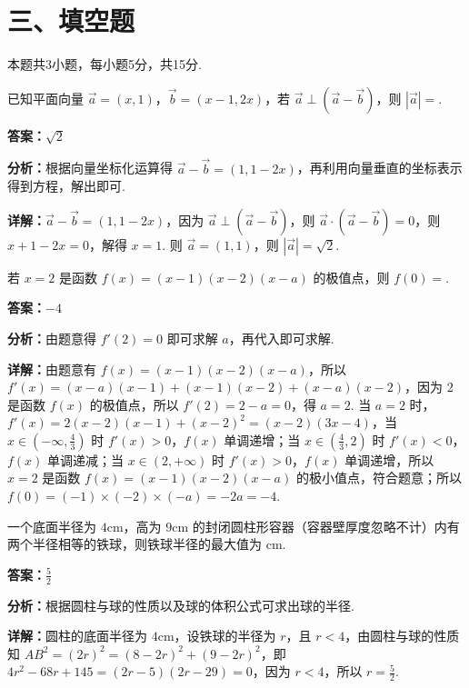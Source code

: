 \section*{三、填空题}
本题共3小题，每小题5分，共15分.

\begin{question}[points=5]
已知平面向量 $\vec{a}=(x,1)$，$\vec{b}=(x-1,2x)$，若 $\vec{a}\perp(\vec{a}-\vec{b})$，则 $|\vec{a}|=$.
\fillin[{$\sqrt{2}$}]
\begin{solution}
\textbf{答案：}$\sqrt{2}$

\textbf{分析：}根据向量坐标化运算得 $\vec{a}-\vec{b}=(1,1-2x)$，再利用向量垂直的坐标表示得到方程，解出即可.

\textbf{详解：}$\vec{a}-\vec{b}=(1,1-2x)$，因为 $\vec{a}\perp(\vec{a}-\vec{b})$，则 $\vec{a}\cdot(\vec{a}-\vec{b})=0$，则 $x+1-2x=0$，解得 $x=1$. 则 $\vec{a}=(1,1)$，则 $|\vec{a}|=\sqrt{2}$.
\end{solution}
\end{question}

\begin{question}[points=5]
若 $x=2$ 是函数 $f(x)=(x-1)(x-2)(x-a)$ 的极值点，则 $f(0)=$.
\fillin[{$-4$}]
\begin{solution}
\textbf{答案：}$-4$

\textbf{分析：}由题意得 $f'(2)=0$ 即可求解 $a$，再代入即可求解.

\textbf{详解：}由题意有 $f(x)=(x-1)(x-2)(x-a)$，所以 $f'(x)=(x-a)(x-1)+(x-1)(x-2)+(x-a)(x-2)$，因为 $2$ 是函数 $f(x)$ 的极值点，所以 $f'(2)=2-a=0$，得 $a=2$. 当 $a=2$ 时，$f'(x)=2(x-2)(x-1)+(x-2)^2=(x-2)(3x-4)$，当 $x\in(-\infty,\frac{4}{3})$ 时 $f'(x)>0$，$f(x)$ 单调递增；当 $x\in(\frac{4}{3},2)$ 时 $f'(x)<0$，$f(x)$ 单调递减；当 $x\in(2,+\infty)$ 时 $f'(x)>0$，$f(x)$ 单调递增，所以 $x=2$ 是函数 $f(x)=(x-1)(x-2)(x-a)$ 的极小值点，符合题意；所以 $f(0)=(-1)\times(-2)\times(-a)=-2a=-4$.
\end{solution}
\end{question}

\begin{question}[points=5]
一个底面半径为 $4\mathrm{cm}$，高为 $9\mathrm{cm}$ 的封闭圆柱形容器（容器壁厚度忽略不计）内有两个半径相等的铁球，则铁球半径的最大值为 $\mathrm{cm}$.
\fillin[{$\frac{5}{2}$}]
\begin{solution}
\textbf{答案：}$\frac{5}{2}$

\textbf{分析：}根据圆柱与球的性质以及球的体积公式可求出球的半径.

\textbf{详解：}圆柱的底面半径为 $4\mathrm{cm}$，设铁球的半径为 $r$，且 $r<4$，由圆柱与球的性质知 $AB^2=(2r)^2=(8-2r)^2+(9-2r)^2$，即 $4r^2-68r+145=(2r-5)(2r-29)=0$，因为 $r<4$，所以 $r=\frac{5}{2}$.
\end{solution}
\end{question}

